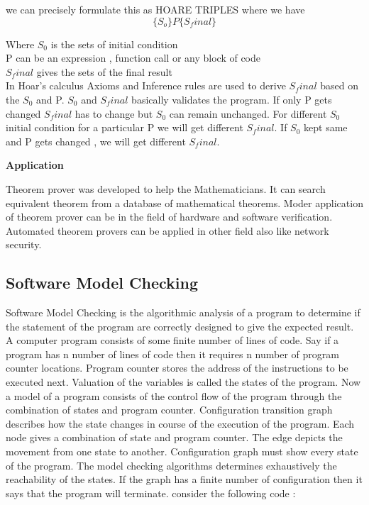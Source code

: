    we can precisely formulate this as HOARE TRIPLES where we have
\begin{equation}
 \{S_o\} P \{S_final\}
\end{equation}

          
  Where $S_0$ is the sets of initial condition \\
        P can be an expression , function call or any block of code \\
        $S_final$ gives the sets of the final result \\
        
In Hoar's calculus Axioms and Inference rules are used to derive $S_final$ based
on the $S_0$ and P. $S_0$ and $S_final$ basically validates the program. If only P gets
changed $S_final$ has to change but $S_0$ can remain unchanged. For different $S_0$ 
initial condition for a particular P we will get different $S_final$. If $S_0$ kept
same and P gets changed , we will get different $S_final$.

\textbf{Application}

Theorem prover was developed to help the Mathematicians. It can search equivalent
theorem from a database of mathematical theorems. Moder application of theorem 
prover can be in the field of hardware and software verification. Automated theorem
provers can be applied in other field also like network security.
          
         

\subsection{Software Model Checking}

Software Model Checking is the algorithmic analysis of a program to determine
if the statement of the program are correctly designed to give the expected 
result. A computer program consists of some finite number of lines of code.
Say if a program has n number of lines of code then it requires n number of
program counter locations. Program counter stores the address of the instructions
to be executed next. Valuation of the variables is called the states of the program.
Now a model of a program  consists of the control flow of the program through the 
combination of states and program counter. 
Configuration transition graph describes how the state changes in course of the
execution of the program. Each node gives a combination of state and program 
counter. The edge depicts the movement from one state to another. Configuration
graph must show every state of the program. The model checking algorithms 
determines exhaustively the reachability of the states. If the graph has a finite
number of configuration then it says that the program will terminate. consider 
the following code :

